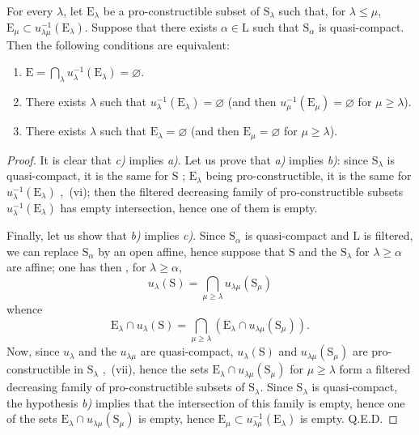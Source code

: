 \begin{corollary}[8.3.3]
\label{IV.8.3.3}
For every $\lambda$, let $\mathrm{E}_\lambda$ be a pro-constructible subset of $\mathrm{S}_\lambda$ such that, for $\lambda\leqslant\mu$, $\mathrm{E}_\mu\subset u_{\lambda\mu}^{-1}(\mathrm{E}_\lambda)$.
Suppose that there exists $\alpha\in\mathrm{L}$ such that $\mathrm{S}_\alpha$ is quasi-compact.
Then the following conditions are equivalent:
\begin{enumerate}[label=\emph{\alph*)}]
  \item $\mathrm{E}=\bigcap_\lambda u_\lambda^{-1}(\mathrm{E}_\lambda)=\varnothing$.
  \item There exists $\lambda$ such that $u_\lambda^{-1}(\mathrm{E}_\lambda)=\varnothing$ \textup{(and then $u_\mu^{-1}(\mathrm{E}_\mu)=\varnothing$ for $\mu\geqslant\lambda$)}.
  \item There exists $\lambda$ such that $\mathrm{E}_\lambda=\varnothing$ \textup{(and then $\mathrm{E}_\mu=\varnothing$ for $\mu\geqslant\lambda$)}.
\end{enumerate}
\end{corollary}

\begin{proof}
It is clear that \emph{c)} implies \emph{a)}.
Let us prove that \emph{a)} implies \emph{b)}: since $\mathrm{S}_\lambda$ is quasi-compact, it is the same for $\mathrm{S}$ ; $\mathrm{E}_\lambda$ being pro-constructible, it is the same for $u_\lambda^{-1}(\mathrm{E}_\lambda)$ ,~(vi); then the filtered decreasing family of pro-constructible subsets $u_\lambda^{-1}(\mathrm{E}_\lambda)$ has empty intersection, hence  one of them is empty.

Finally, let us show that \emph{b)} implies \emph{c)}.
Since $\mathrm{S}_\alpha$ is quasi-compact and $\mathrm{L}$ is filtered, we can replace $\mathrm{S}_\alpha$ by an open affine, hence suppose  that $\mathrm{S}$ and the $\mathrm{S}_\lambda$ for $\lambda\geqslant\alpha$ are affine; one has then , for $\lambda\geqslant\alpha$,
\[
  u_\lambda(\mathrm{S})=\bigcap_{\mu\geqslant\lambda}u_{\lambda\mu}(\mathrm{S}_\mu)
\]
whence
\[
  \mathrm{E}_\lambda\cap u_\lambda(\mathrm{S})=\bigcap_{\mu\geqslant\lambda}(\mathrm{E}_\lambda\cap u_{\lambda\mu}(\mathrm{S}_\mu)).
\]
Now, since $u_\lambda$ and the $u_{\lambda\mu}$ are quasi-compact, $u_\lambda(\mathrm{S})$ and $u_{\lambda\mu}(\mathrm{S}_\mu)$ are pro-constructible in $\mathrm{S}_\lambda$ ,~(vii), hence the sets $\mathrm{E}_\lambda\cap u_{\lambda\mu}(\mathrm{S}_\mu)$ for $\mu\geqslant\lambda$ form a filtered decreasing family of pro-constructible subsets of $\mathrm{S}_\lambda$.
Since $\mathrm{S}_\lambda$ is quasi-compact, the hypothesis \emph{b)} implies that the intersection of this family is empty, hence  one of the sets $\mathrm{E}_\lambda\cap u_{\lambda\mu}(\mathrm{S}_\mu)$ is empty, hence $\mathrm{E}_\mu\subset u_{\lambda\mu}^{-1}(\mathrm{E}_\lambda)$ is empty. Q.E.D.
\end{proof}

